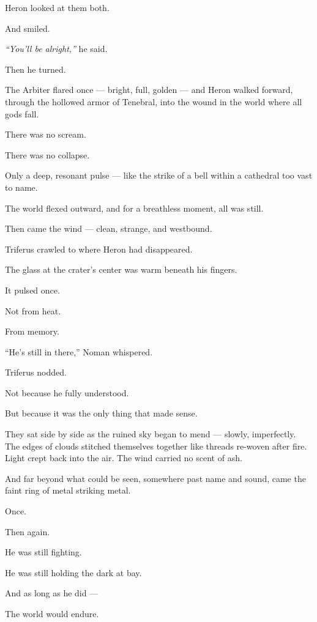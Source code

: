 \documentclass[12pt]{article}
\begin{document}
Heron looked at them both.

And smiled.

\textit{“You’ll be alright,”} he said.

Then he turned.

The Arbiter flared once — bright, full, golden — and Heron walked forward, through the hollowed armor of Tenebral, into the wound in the world where all gods fall.

\bigskip

There was no scream.

There was no collapse.

Only a deep, resonant pulse — like the strike of a bell within a cathedral too vast to name.

The world flexed outward, and for a breathless moment, all was still.

Then came the wind — clean, strange, and westbound.

\bigskip

Triferus crawled to where Heron had disappeared.

The glass at the crater’s center was warm beneath his fingers.

It pulsed once.

Not from heat.

From memory.

\bigskip

“He’s still in there,” Noman whispered.

Triferus nodded.

Not because he fully understood.

But because it was the only thing that made sense.

\bigskip

They sat side by side as the ruined sky began to mend — slowly, imperfectly. The edges of clouds stitched themselves together like threads re-woven after fire. Light crept back into the air. The wind carried no scent of ash.

And far beyond what could be seen, somewhere past name and sound, came the faint ring of metal striking metal.

Once.

Then again.

\bigskip

He was still fighting.

He was still holding the dark at bay.

And as long as he did —

The world would endure.
\end{document}
